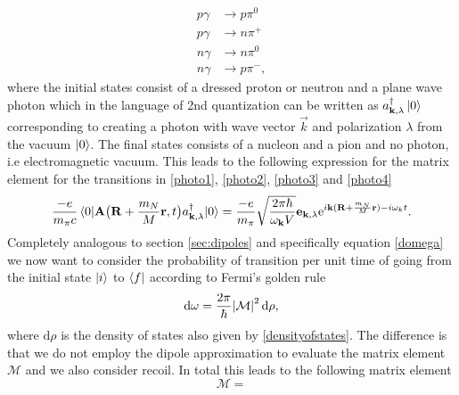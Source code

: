 \begin{align}
	p \gamma & \rightarrow p \pi^0 \label{photo1}\\
	p \gamma & \rightarrow n \pi^+ \label{photo2}\\
	n \gamma & \rightarrow n \pi^0 \label{photo3}\\
	n \gamma & \rightarrow p \pi^- \label{photo4},
\end{align}
where the initial states consist of a dressed proton or neutron and a plane wave photon which in the language of 2nd quantization can be written as $a_{\bm{\mathrm{k}},\lambda}^\dagger \ket{0}$ corresponding to creating a photon with wave vector $\vec{k}$ and polarization $\lambda$ from the vacuum $\ket{0}$. The final states consists of a nucleon and a pion and no photon, i.e electromagnetic vacuum. This leads to the following expression for the matrix element for the transitions in \eqref{photo1}, \eqref{photo2}, \eqref{photo3} and \eqref{photo4}
\begin{equation}
	\frac{-e}{m_\pi c}\mel*{0}{\bm{\mathrm{A}}\big( \bm{\mathrm{R}}+\frac{m_N}{M}\bm{\mathrm{r}},t\big) a_{\bm{\mathrm{k}},\lambda}^\dagger}{0} = \frac{-e}{m_\pi} \sqrt{\frac{2\pi \hbar}{\omega_{\bm{\mathrm{k}}}V}} \bm{\mathrm{e}}_{\bm{\mathrm{k}},\lambda}\text{e}^{i\bm{\mathrm{k}}(\bm{\mathrm{R}}+\frac{m_N}{M}\bm{\mathrm{r}})-i\omega_k t}.
\end{equation}
Completely analogous to section \ref{sec:dipoles} and specifically equation \eqref{domega} we now want to consider the probability of transition per unit time of going from the initial state $\ket{i}$ to $\bra{f}$ according to Fermi's golden rule
\begin{equation}
	\text{d}\omega = \frac{2\pi}{\hbar} \abs{\mathcal{M}}^2 \text{d}\rho,
\end{equation}
where $\text{d}\rho
$ is the density of states also given by \eqref{densityofstates}. The difference is that we do not employ the dipole approximation to evaluate the matrix element $\mathcal{M}$ and we also consider recoil. In total this leads to the following matrix element
\begin{equation}
	\mathcal{M}=
\end{equation}



